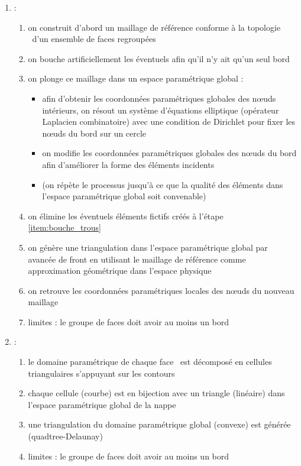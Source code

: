 \begin{enumerate}
\begin{enumerate}
\begin{enumerate}
				\item \cite{marcum1999} :
				\begin{enumerate}
					\item on construit d'abord un maillage de référence conforme à la topologie \brep\ d'un ensemble de faces regroupées
					\item \label{item:bouche_trous} on bouche artificiellement les éventuels  afin qu'il n'y ait qu'un seul bord
					\item on plonge ce maillage dans un espace paramétrique global :
					\begin{itemize}
						\item afin d'obtenir les coordonnées paramétriques globales des n\oe uds intérieurs, on résout un système d'équations elliptique (opérateur Laplacien combinatoire) avec une condition de Dirichlet pour fixer les n\oe uds du bord sur un cercle
						\item on modifie les coordonnées paramétriques globales des n\oe uds du bord afin d'améliorer la forme des éléments incidents
						\item (on répète le processus jusqu'à ce que la qualité des éléments dans l'espace paramétrique global soit convenable)
					\end{itemize}
					\item on élimine les éventuels éléments fictifs créés à l'étape \ref{item:bouche_trous}
					\item on génère une triangulation dans l'espace paramétrique global par avancée de front en utilisant le maillage de référence comme approximation géométrique dans l'espace physique
					\item on retrouve les coordonnées paramétriques locales des n\oe uds du nouveau maillage 
					\item limites : le groupe de faces doit avoir au moins un bord
				\end{enumerate}
				
				\item \cite{noel2002} : 
				\begin{enumerate}
					\item le domaine paramétrique de chaque face \brep\ est décomposé en cellules triangulaires s'appuyant sur les contours
					\item chaque cellule (courbe) est en bijection avec un triangle (linéaire) dans l'espace paramétrique global de la nappe
					\item une triangulation du domaine paramétrique global (convexe) est générée (quadtree-Delaunay) 
					\item limites : le groupe de faces doit avoir au moins un bord
				\end{enumerate}
				

\end{enumerate}
\end{enumerate}
\end{enumerate}
